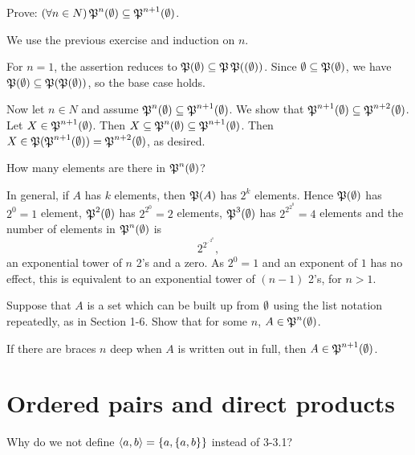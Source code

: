 \begin{exercise}
Prove: $(\forall n\in N)\operatorname{\mathfrak{P}}^{n}(\emptyset)\subseteq\operatorname{\mathfrak{P}}^{n+1}(\emptyset)$.
\end{exercise}

\begin{solution}
We use the previous exercise and induction on $n$.

For $n=1$, the assertion reduces to $\operatorname{\mathfrak{P}}(\emptyset)\subseteq\operatorname{\mathfrak{P}}\operatorname{\mathfrak{P}}((\emptyset))$.
Since $\emptyset\subseteq\operatorname{\mathfrak{P}}(\emptyset)$, we have $\operatorname{\mathfrak{P}}(\emptyset)\subseteq\operatorname{\mathfrak{P}}(\operatorname{\mathfrak{P}}(\emptyset))$, so the base case holds.

Now let $n\in N$ and assume $\operatorname{\mathfrak{P}}^{n}(\emptyset)\subseteq\operatorname{\mathfrak{P}}^{n+1}(\emptyset)$.
We show that $\operatorname{\mathfrak{P}}^{n+1}(\emptyset)\subseteq\operatorname{\mathfrak{P}}^{n+2}(\emptyset)$.
Let $X\in \operatorname{\mathfrak{P}}^{n+1}(\emptyset)$. Then $X\subseteq \operatorname{\mathfrak{P}}^{n}(\emptyset)\subseteq \operatorname{\mathfrak{P}}^{n+1}(\emptyset)$.
Then $X\in \operatorname{\mathfrak{P}}(\operatorname{\mathfrak{P}}^{n+1}(\emptyset))=\operatorname{\mathfrak{P}}^{n+2}(\emptyset)$, as desired.
\end{solution}

\begin{exercise}
How many elements are there in $\operatorname{\mathfrak{P}}^n(\emptyset)$?
\end{exercise}

\begin{solution}
In general, if $A$ has $k$ elements, then $\operatorname{\mathfrak{P}}(A)$ has $2^k$ elements.
Hence $\operatorname{\mathfrak{P}}(\emptyset)$ has $2^0=1$ element, $\operatorname{\mathfrak{P}}^2(\emptyset)$ has $2^{2^0}=2$ elements,
$\operatorname{\mathfrak{P}}^3(\emptyset)$ has $2^{2^{2^0}}=4$ elements
and the number of elements in $\operatorname{\mathfrak{P}}^n(\emptyset)$ is
\[2^{2^{\iddots^{2^0}}},\]
an exponential tower of $n$ 2's and a zero.
As $2^0=1$ and an exponent of $1$ has no effect, this is equivalent to an exponential tower of
$(n-1)$ 2's, for $n>1$.
\end{solution}

\begin{exercise}
Suppose that $A$ is a set which can be built up from $\emptyset$ using the list notation
repeatedly, as in Section 1-6. Show that for some $n$, $A \in\operatorname{\mathfrak{P}}^n(\emptyset)$.
\end{exercise}

\begin{solution}
If there are braces $n$ deep when $A$ is written out in full, then $A\in\operatorname{\mathfrak{P}}^{n+1}(\emptyset)$.
\end{solution}

\section{Ordered pairs and direct products}
\begin{exercise}
Why do we not define $\left\langle a,b\right\rangle = \left\{a, \left\{a,b\right\}\right\}$ instead of 3-3.1?
\end{exercise}

